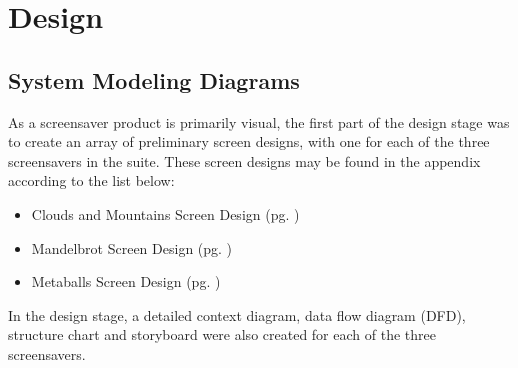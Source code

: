 \documentclass[10pt, openany]{book}
\begin{document}
{\let\clearpage\relax \chapter{Design}}

\section{System Modeling Diagrams}
As a screensaver product is primarily visual, the first part of the design stage was to create an array of preliminary screen designs, with one for each of the three screensavers in the suite.
These screen designs may be found in the appendix according to the list below:
\begin{itemize}
	\item Clouds and Mountains Screen Design (pg. \pageref{app:clouds-screen})
	\item Mandelbrot Screen Design (pg. \pageref{app:mandelbrot-screen})
	\item Metaballs Screen Design (pg. \pageref{app:metaballs-screen})
\end{itemize}

In the design stage, a detailed context diagram, data flow diagram (DFD), structure chart and storyboard were also created for each of the three screensavers. 
\end{document}
